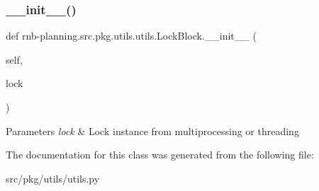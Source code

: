 \subsubsection{\texorpdfstring{\+\_\+\+\_\+init\+\_\+\+\_\+()}{\_\_init\_\_()}}
{\footnotesize\ttfamily def rnb-\/planning.\+src.\+pkg.\+utils.\+utils.\+Lock\+Block.\+\_\+\+\_\+init\+\_\+\+\_\+ (\begin{DoxyParamCaption}\item[{}]{self,  }\item[{}]{lock }\end{DoxyParamCaption})}


\begin{DoxyParams}{Parameters}
{\em lock} & Lock instance from multiprocessing or threading \\
\hline
\end{DoxyParams}


The documentation for this class was generated from the following file\+:\begin{DoxyCompactItemize}
\item 
src/pkg/utils/utils.\+py\end{DoxyCompactItemize}
